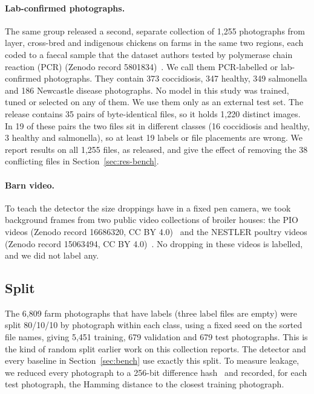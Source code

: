 \documentclass[10pt,twocolumn]{article}
\begin{document}
\paragraph{Lab-confirmed photographs.} The same group released a second, separate collection of 1,255 photographs
from layer, cross-bred and indigenous chickens on farms in the same two regions, each coded to a faecal sample that
the dataset authors tested by polymerase chain reaction (PCR) (Zenodo record 5801834)~\cite{machuve2021pcr}. We call
them PCR-labelled or lab-confirmed photographs. They contain 373 coccidiosis, 347 healthy, 349 salmonella and 186
Newcastle disease photographs. No model in this study was trained, tuned or selected on any of them. We use them only
as an external test set. The release contains 35 pairs of byte-identical files, so it holds 1,220 distinct images.
In 19 of these pairs the two files sit in different classes (16 coccidiosis and healthy, 3 healthy and salmonella),
so at least 19 labels or file placements are wrong. We report results on all 1,255 files, as released, and give the
effect of removing the 38 conflicting files in Section~\ref{sec:res-bench}.

\paragraph{Barn video.} To teach the detector the size droppings have in a fixed pen camera, we took background
frames from two public video collections of broiler houses: the PIO videos (Zenodo record 16686320, CC BY
4.0)~\cite{boniche2025piodata,boniche2026pio} and the NESTLER poultry videos (Zenodo record 15063494, CC BY 4.0)~\cite{nestler2025}. No dropping in these
videos is labelled, and we did not label any.

\subsection{Split}
\label{sec:split}

The 6,809 farm photographs that have labels (three label files are empty) were split 80/10/10 by photograph within
each class, using a fixed seed on the sorted file names, giving 5,451 training, 679 validation and 679 test
photographs. This is the kind of random split earlier work
on this collection reports. The detector and every baseline in Section~\ref{sec:bench} use exactly this split. To
measure leakage, we reduced every photograph to a 256-bit difference hash~\cite{krawetz2013} and recorded, for
each test photograph, the Hamming distance to the closest training photograph.
\end{document}
